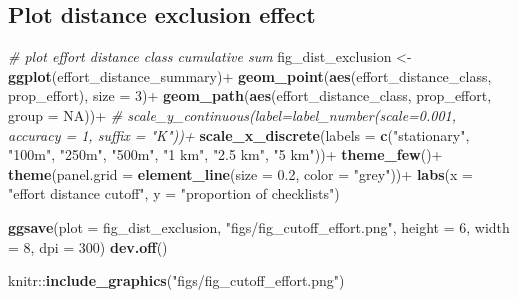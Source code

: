 \documentclass[]{article}
\newenvironment{Shaded}{}{}
\newcommand{\CommentTok}[1]{\textcolor[rgb]{0.38,0.63,0.69}{\textit{#1}}}
\newcommand{\DataTypeTok}[1]{\textcolor[rgb]{0.56,0.13,0.00}{#1}}
\newcommand{\DecValTok}[1]{\textcolor[rgb]{0.25,0.63,0.44}{#1}}
\newcommand{\FloatTok}[1]{\textcolor[rgb]{0.25,0.63,0.44}{#1}}
\newcommand{\KeywordTok}[1]{\textcolor[rgb]{0.00,0.44,0.13}{\textbf{#1}}}
\newcommand{\NormalTok}[1]{#1}
\newcommand{\OperatorTok}[1]{\textcolor[rgb]{0.40,0.40,0.40}{#1}}
\newcommand{\OtherTok}[1]{\textcolor[rgb]{0.00,0.44,0.13}{#1}}
\newcommand{\StringTok}[1]{\textcolor[rgb]{0.25,0.44,0.63}{#1}}
\begin{document}
\hypertarget{plot-distance-exclusion-effect}{%
\subsection{Plot distance exclusion effect}\label{plot-distance-exclusion-effect}}

\begin{Shaded}
\begin{Highlighting}[]
\CommentTok{# plot effort distance class cumulative sum}
\NormalTok{fig_dist_exclusion <-}\StringTok{ }\KeywordTok{ggplot}\NormalTok{(effort_distance_summary)}\OperatorTok{+}
\StringTok{  }\KeywordTok{geom_point}\NormalTok{(}\KeywordTok{aes}\NormalTok{(effort_distance_class, prop_effort), }\DataTypeTok{size =} \DecValTok{3}\NormalTok{)}\OperatorTok{+}
\StringTok{  }\KeywordTok{geom_path}\NormalTok{(}\KeywordTok{aes}\NormalTok{(effort_distance_class, prop_effort, }\DataTypeTok{group =} \OtherTok{NA}\NormalTok{))}\OperatorTok{+}
\StringTok{  }\CommentTok{# scale_y_continuous(label=label_number(scale=0.001, accuracy = 1, suffix = "K"))+}
\StringTok{  }\KeywordTok{scale_x_discrete}\NormalTok{(}\DataTypeTok{labels =} \KeywordTok{c}\NormalTok{(}\StringTok{"stationary"}\NormalTok{, }\StringTok{"100m"}\NormalTok{, }\StringTok{"250m"}\NormalTok{, }\StringTok{"500m"}\NormalTok{, }\StringTok{"1 km"}\NormalTok{, }\StringTok{"2.5 km"}\NormalTok{, }\StringTok{"5 km"}\NormalTok{))}\OperatorTok{+}
\StringTok{  }\KeywordTok{theme_few}\NormalTok{()}\OperatorTok{+}
\StringTok{  }\KeywordTok{theme}\NormalTok{(}\DataTypeTok{panel.grid =} \KeywordTok{element_line}\NormalTok{(}\DataTypeTok{size =} \FloatTok{0.2}\NormalTok{, }\DataTypeTok{color =} \StringTok{"grey"}\NormalTok{))}\OperatorTok{+}
\StringTok{  }\KeywordTok{labs}\NormalTok{(}\DataTypeTok{x =} \StringTok{"effort distance cutoff"}\NormalTok{, }\DataTypeTok{y =} \StringTok{"proportion of checklists"}\NormalTok{)}

\KeywordTok{ggsave}\NormalTok{(}\DataTypeTok{plot =}\NormalTok{ fig_dist_exclusion, }\StringTok{"figs/fig_cutoff_effort.png"}\NormalTok{, }\DataTypeTok{height =} \DecValTok{6}\NormalTok{, }\DataTypeTok{width =} \DecValTok{8}\NormalTok{, }\DataTypeTok{dpi =} \DecValTok{300}\NormalTok{)}
\KeywordTok{dev.off}\NormalTok{()}
\end{Highlighting}
\end{Shaded}

\begin{Shaded}
\begin{Highlighting}[]
\NormalTok{knitr}\OperatorTok{::}\KeywordTok{include_graphics}\NormalTok{(}\StringTok{"figs/fig_cutoff_effort.png"}\NormalTok{)}
\end{Highlighting}
\end{Shaded}
\end{document}
